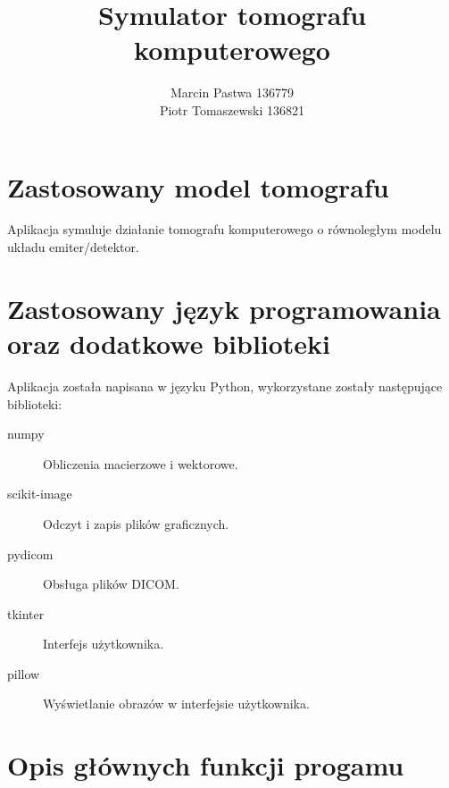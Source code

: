 \documentclass[a4paper]{article}
\title{Symulator tomografu komputerowego}
\author{Marcin Pastwa 136779\\
Piotr Tomaszewski 136821 }
\date{}
\begin{document}
\maketitle
\section{Zastosowany model tomografu}
Aplikacja symuluje działanie tomografu komputerowego o równoległym modelu układu emiter/detektor.

\section{Zastosowany język programowania oraz dodatkowe biblioteki}
Aplikacja została napisana w języku Python, wykorzystane zostały następujące biblioteki:
\begin{description}
    \item [numpy] Obliczenia macierzowe i wektorowe.
    \item [scikit-image] Odczyt i zapis plików graficznych.
    \item [pydicom] Obsługa plików DICOM.
    \item [tkinter] Interfejs użytkownika.
    \item [pillow] Wyświetlanie obrazów w interfejsie użytkownika.
\end{description}

\section{Opis głównych funkcji progamu}
\end{document}
